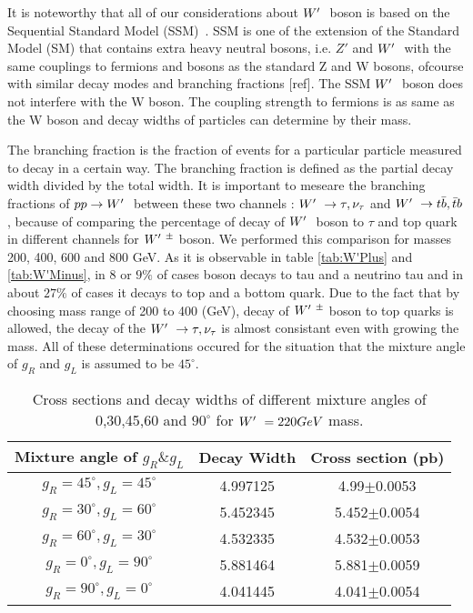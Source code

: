 It is noteworthy that all of our considerations about $ W^\prime~ $ boson is based on the Sequential Standard Model (SSM)~\cite{Khachatryan:2014tva}. SSM is one of the extension of the Standard Model (SM) that contains extra heavy neutral bosons, i.e. $ Z' $ and $ W^\prime~ $ with the same couplings to fermions and bosons as the standard Z and W bosons, ofcourse with similar decay modes and branching fractions [ref]. The SSM $ W^\prime~ $ boson does not interfere with the W boson. The coupling strength to fermions is as same as the W boson and decay widths of particles can determine by their mass. 

  The branching fraction is the fraction of events for a particular particle measured to decay in a certain way. The branching fraction is defined as the partial decay width divided by the total width. It is important to meseare the branching fractions of $ pp\rightarrow W^\prime~$ between these two channels : $ W^\prime~\rightarrow \tau,\nu_\tau $ and $ W^\prime~\rightarrow  t \bar{b},\bar{t}b $, because of comparing the percentage of decay of $ W^\prime~ $ boson to $ \tau $ and top quark in different channels for $ W^\prime~^\pm $ boson. We performed this comparison for masses 200, 400, 600 and 800 GeV. As it is observable in table \ref{tab:W'Plus} and \ref{tab:W'Minus}, in 8 or $9\%$ of cases \wprime boson decays to tau and a neutrino tau and in about $27\%$ of cases it decays to top and a bottom quark. Due to the fact that by choosing mass range of 200 to 400 (GeV), decay of $ W^\prime~^\pm $ boson to top quarks is allowed, the decay of the $ W^\prime~\rightarrow \tau,\nu_\tau $ is almost consistant even with growing the mass. All of these determinations occured for the situation that the mixture angle of $ g_R$ and  $g_L$ is assumed to be $45^\circ $. 
 



\begin{table}[htb]
	\centering
\begin{tabular}{|c|c|c|}
\hline 
Mixture angle of $ g_R \& g_L $  &  Decay Width  &  Cross section (pb)\\
\hline 
$g_R=45^\circ,g_L=45^\circ$& 4.997125& 4.99$\pm$0.0053\\
$g_R=30^\circ,g_L=60^\circ$ &5.452345& 5.452$\pm$0.0054\\
$g_R=60^\circ,g_L=30^\circ$& 4.532335& 4.532$\pm$0.0053 \\
$g_R=0^\circ,g_L=90^\circ$&5.881464& 5.881$\pm$0.0059\\
$g_R=90^\circ,g_L=0^\circ$& 4.041445& 4.041$\pm$0.0054\\


\hline
\end{tabular}
\caption{Cross sections and decay widths of different mixture angles of 0,30,45,60 and $90^\circ$ for $W^\prime~ =220 GeV$ mass. \label{tab:220 GeV} }
\end{table}



